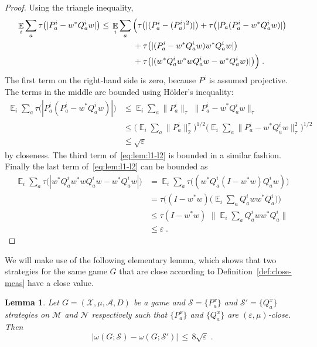 \documentclass[11pt]{article}
\newtheorem{lemma}[theorem]{Lemma}
\theoremstyle{definition}
\newcommand{\strategy}{\mathscr{S}}
\DeclareMathOperator*{\Expectation}{\mathbb{E}}
\newcommand{\Es}[1]{\Expectation_{#1}}
\newcommand{\mA}{\ensuremath{\mathcal{A}}}
\newcommand{\mM}{\ensuremath{\mathcal{M}}}
\newcommand{\mX}{\ensuremath{\mathcal{X}}}
\newcommand{\eps}{\varepsilon}
\newcommand{\mN}{\mathcal{N}}
\begin{document}
\begin{proof}
Using the triangle inequality, 
\begin{align}
\Es{i} \sum_a \tau\big(|P^i_a - w^* Q^i_a w|\big) &\leq\, \Es{i}\sum_a \Big(\tau\big(|(P^i_a-(P^i_a)^2)|\big) + \tau\big(|P_a(P^i_a-w^*Q^i_aw)|\big) \notag\\
&\qquad\qquad+ \tau\big(|(P^i_a-w^*Q^i_aw)w^*Q^i_aw|\big) \notag \\
&\qquad \qquad+\tau\big(| (w^*Q^i_aw^*wQ^i_aw-w^*Q^i_aw)|\big)\Big)\;. \label{eq:lem:l1-l2}
\end{align}
The first term on the right-hand side is zero, because $P^i$ is assumed projective. The terms in the middle are bounded using H\"older's inequality:
\begin{align*}
\Es{i}\sum_a  \tau\big(|P^i_a(P^i_a-w^*Q^i_aw)|\big) &\leq \Es{i} \sum_a \|P^i_a\|_\tau \, \, \|P^i_a-w^*Q^i_aw\|_\tau\\
&\leq \Big(\Es{i}\sum_a \|P^i_a\|^\tau_2\Big)^{1/2}\Big( \Es{i}\sum_a  \|P^i_a-w^*Q^i_aw\|_\tau^2 \Big)^{1/2}\\
&\leq \sqrt{\eps}
\end{align*}
by closeness. The third term of~\eqref{eq:lem:l1-l2} is bounded in a similar fashion.
Finally the last term of~\eqref{eq:lem:l1-l2} can be bounded as 
\begin{align*}
\Es{i}\sum_a \tau\big(| w^*Q^i_aw^*wQ^i_aw-w^*Q^i_aw|\big) &= \Es{i}\sum_a \tau\big( (w^*Q^i_a(I - w^*w)Q^i_aw)\big)\\
&=  \tau\Big( (I-w^*w)\Big(\Es{i}\sum_a Q^i_aww^* Q^i_a\Big)\Big)\\
&\leq \tau(I-w^*w) \,\, \Big\|\Es{i}\sum_a Q^i_aww^* Q^i_a\Big\|\\
&\leq \eps\;.
\end{align*}
\end{proof}


We will make use of the following elementary lemma, which shows that two strategies for the same game $G$ that are close according to Definition~\ref{def:close-meas} have a close value. 

\begin{lemma}\label{lem:close-value}
Let $G=(\mX,\mu,\mA,D)$ be a game and $\strategy=\{P^x_a\}$ and $\strategy'=\{Q^x_a\}$ strategies on $\mM$ and $\mN$ respectively such that $\{P^x_a\}$ and $\{Q^x_a\}$ are $(\eps,\mu)$-close. Then 
\[ \big|\omega(G;\strategy) - \omega(G;\strategy')\big|\,\leq\, 8\sqrt{\eps} \;.\]
\end{lemma}
\end{document}
